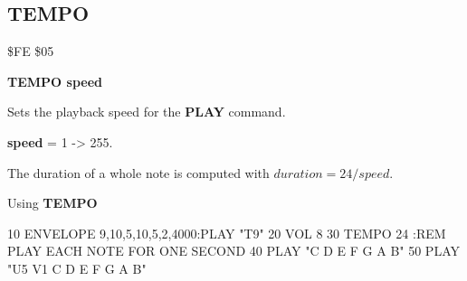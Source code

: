
\newpage
\subsection{TEMPO}
\begin{description}[leftmargin=3cm,style=nextline]
\item [Token:] \$FE \$05
\item [Format:] {\bf TEMPO speed}
\item [Usage:] Sets the playback speed for the {\bf PLAY} command.

               {\bf speed} = 1 -> 255.

               The duration of a whole note is computed with
               $ duration = 24 / speed $.

\item [Example:] Using {\bf TEMPO}
\begin{screenoutput}
10 ENVELOPE 9,10,5,10,5,2,4000:PLAY "T9"
20 VOL 8
30 TEMPO 24      :REM PLAY EACH NOTE FOR ONE SECOND
40 PLAY "C D E F G A B"
50 PLAY "U5 V1 C D E F G A B"
\end{screenoutput}
\end{description}


\newpage
